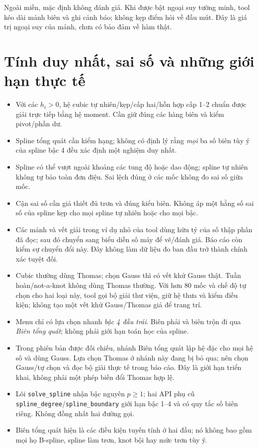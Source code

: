 Ngoài miền, mặc định không đánh giá. Khi được bật ngoại suy tường minh, tool kéo dài mảnh biên và ghi cảnh báo; không kẹp điểm hỏi về đầu mút.
Đây là giá trị ngoại suy của mảnh, chưa có bảo đảm về hàm thật.

\section{Tính duy nhất, sai số và những giới hạn thực tế}
\label{sec:spline-limits}
\begin{itemize}
\item Với các $h_i>0$, hệ cubic tự nhiên/kẹp/cấp hai/hỗn hợp cấp 1--2 chuẩn được giải trực tiếp bằng hệ moment. Cần giữ đúng các hàng biên và kiểm pivot/phần dư.
\item Spline tổng quát cần kiểm hạng; không có định lý rằng \emph{mọi} ba số biên tùy ý của spline bậc 4 đều xác định một nghiệm duy nhất.
\item Spline có thể vượt ngoài khoảng các tung độ hoặc dao động; spline tự nhiên không tự bảo toàn đơn điệu. Sai lệch đúng ở các mốc không đo sai số giữa mốc.
\item Cận sai số cần giả thiết đủ trơn và đúng kiểu biên. Không áp một hằng số sai số của spline kẹp cho mọi spline tự nhiên hoặc cho mọi bậc.
\item Các mảnh và vết giải trong ví dụ nhỏ của tool dùng hữu tỷ của số thập phân đã đọc; sau đó chuyển sang biểu diễn số máy để vẽ/đánh giá. Báo cáo còn kiểm sự chuyển đổi này. Đây không làm dữ liệu đo ban đầu trở thành chính xác tuyệt đối.
\item Cubic thường dùng Thomas; chọn Gauss thì có vết khử Gauss thật. Tuần hoàn/not-a-knot không dùng Thomas thường. Với hơn 80 mốc và chế độ tự chọn cho hai loại này, tool gọi bộ giải thư viện, giữ hệ thưa và kiểm điều kiện; không tạo một vết khử Gauss/Thomas giả để trang trí.
\item Menu chỉ có lựa chọn nhanh \emph{bậc 4 đầu trái}. Biên phải và biên trộn đi qua \emph{Biên tổng quát}; không phải giới hạn toán học của spline.
\item Trong phiên bản được đối chiếu, nhánh Biên tổng quát lập hệ đặc cho mọi hệ số và dùng Gauss. Lựa chọn Thomas ở nhánh này đang bị bỏ qua; nên chọn Gauss/tự chọn và đọc bộ giải thực tế trong báo cáo. Đây là giới hạn triển khai, không phải một phép biến đổi Thomas hợp lệ.
\item Lõi \texttt{solve\_spline} nhận bậc nguyên $p\geq1$; hai API phụ cũ \texttt{spline\_degree}/\texttt{spline\_boundary} giới hạn bậc 1--4 và có quy tắc số biên riêng. Không đồng nhất hai đường gọi.
\item Biên tổng quát hiện là các điều kiện tuyến tính ở hai đầu; nó không bao gồm mọi họ B-spline, spline làm trơn, knot bội hay mức trơn tùy ý.
\end{itemize}

